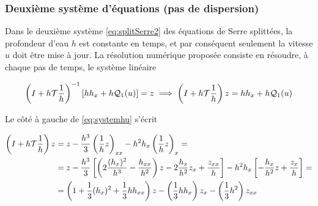 %
%
%

\subsubsection{Deuxième système d'équations (pas de dispersion)}

\indent Dans le deuxième système \eqref{eq:splitSerre2} des équations de Serre splittées, la profondeur d'eau $h$ est constante en temps, et par conséquent seulement la vitesse $u$ doit être mise à jour.  La résolution numérique proposée consiste en résoudre, à chaque pas de temps, le système linéaire

\begin{equation}
	\label{eq:systemhu}
	\left(I + h\mathcal{T}\frac{1}{h} \right)^{-1}\left[ hh_x + h\mathcal{Q}_1(u) \right]  = z \implies \left(I + h\mathcal{T}\frac{1}{h} \right)z = hh_x + h\mathcal{Q}_1(u)
\end{equation}

\indent Le côté à gauche de \eqref{eq:systemhu} s'écrit

\begin{equation*}
\begin{aligned}
	 \left(I + h\mathcal{T}\frac{1}{h}\right)z  & =  z - \frac{h^3}{3}\left( \frac{1}{h} z\right)_{xx} - h^2h_x\left( \frac{1}{h} z\right)_x  = \\
						  & = z - \frac{h^3}{3}\left[ \left( 2\frac{(h_x)^2}{h^3} - \frac{h_{xx}}{h^2} \right)z - 2\frac{h_x}{h^2}z_x + \frac{z_{xx}}{h}	\right] - h^2h_x\left[ -\frac{h_x}{h^2}z + \frac{z_x}{h}\right] = \\
						  &  = \left( 1 + \frac{1}{3}(h_x)^2 + \frac{1}{3}hh_{xx}\right)z - \left(\frac{1}{3}hh_x\right)z_x - \left(\frac{1}{3}h^2\right)z_{xx}
\end{aligned}
\end{equation*}

